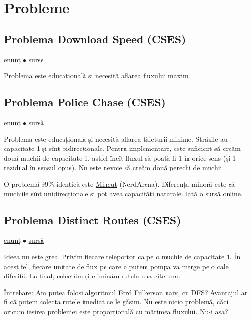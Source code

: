 \documentclass[../main.tex]{subfiles}
\begin{document}
\section{Probleme}

\subsection{Problema Download Speed (CSES)}
\label{problem:download-speed}

\href{https://cses.fi/problemset/task/1694}{enunț}
$\bullet$
\hyperref[code:download-speed]{surse}

Problema este educațională și necesită aflarea fluxului maxim.


\subsection{Problema Police Chase (CSES)}
\label{problem:police-chase}

\href{https://cses.fi/problemset/task/1695}{enunț}
$\bullet$
\hyperref[code:police-chase]{sursă}

Problema este educațională și necesită aflarea tăieturii minime. Străzile au capacitate 1 și sînt bidirecționale. Pentru implementare, este suficient să creăm două muchii de capacitate 1, astfel încît fluxul să poată fi 1 în orice sens (și 1 rezidual în sensul opus). Nu este nevoie să creăm două perechi de muchii.

O problemă 99\% identică este \href{https://www.nerdarena.ro/problema/mincut}{Mincut} (NerdArena). Diferența minoră este că muchiile sînt unidirecționale și pot avea capacități naturale. Iată \href{https://www.nerdarena.ro/job_detail/859647?action=view-source}{o sursă} online.


\subsection{Problema Distinct Routes (CSES)}
\label{problem:distinct-routes}

\href{https://cses.fi/problemset/task/1711}{enunț}
$\bullet$
\hyperref[code:distinct-routes]{sursă}

Ideea nu este grea. Privim fiecare teleportor ca pe o muchie de capacitate 1. În acest fel, fiecare unitate de flux pe care o putem pompa va merge pe o cale diferită. La final, colectăm și eliminăm rutele una cîte una.

Întrebare: Am putea folosi algoritmul Ford Fulkerson naiv, cu DFS? Avantajul ar fi că putem colecta rutele imediat ce le găsim. Nu este nicio problemă, căci oricum ieșirea problemei este proporțională cu mărimea fluxului. Nu-i așa?
\end{document}
